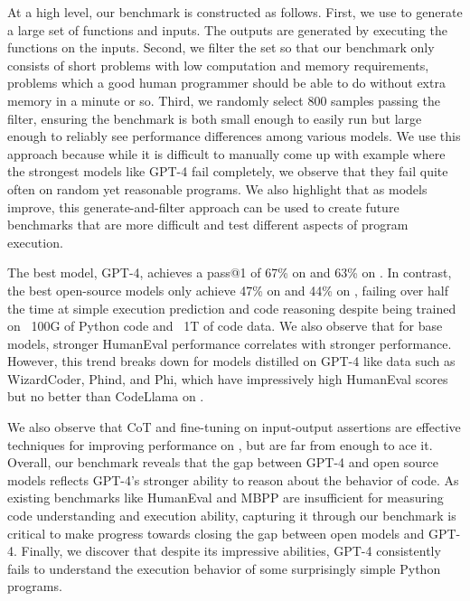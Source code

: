 At a high level, our benchmark is constructed as follows. First, we use \codellamalarge to generate a large set of functions and inputs. The outputs are generated by executing the functions on the inputs. Second, we filter the set so that our benchmark only consists of short problems with low computation and memory requirements, problems which a good human programmer should be able to do without extra memory in a minute or so. Third, we randomly select 800 samples passing the filter, ensuring the benchmark is both small enough to easily run but large enough to reliably see performance differences among various models. We use this approach because while it is difficult to manually come up with example where the strongest models like GPT-4 fail completely, we observe that they fail quite often on random yet reasonable programs. We also highlight that as models improve, this generate-and-filter approach can be used to create future benchmarks that are more difficult and test different aspects of program execution.

The best model, GPT-4, achieves a pass@1 of 67\% on \benchmarki and 63\% on \benchmarko. In contrast, the best open-source models only achieve 47\% on \benchmarki and 44\% on \benchmarko, failing over half the time at simple execution prediction and code reasoning despite being trained on ~100G of Python code and ~1T of code data. We also observe that for base models, stronger HumanEval performance correlates with stronger \benchmark performance. However, this trend breaks down for models distilled on GPT-4 like data such as WizardCoder, Phind, and Phi, which have impressively high HumanEval scores but no better than CodeLlama on \benchmark.

We also observe that CoT and fine-tuning on input-output assertions are effective techniques for improving performance on \benchmark, but are far from enough to ace it. Overall, our benchmark reveals that the gap between GPT-4 and open source models reflects GPT-4's stronger ability to reason about the behavior of code. As existing benchmarks like HumanEval and MBPP are insufficient for measuring code understanding and execution ability, capturing it through our benchmark is critical to make progress towards closing the gap between open models and GPT-4. Finally, we discover that despite its impressive abilities, GPT-4 consistently fails to understand the execution behavior of some surprisingly simple Python programs. 


%

